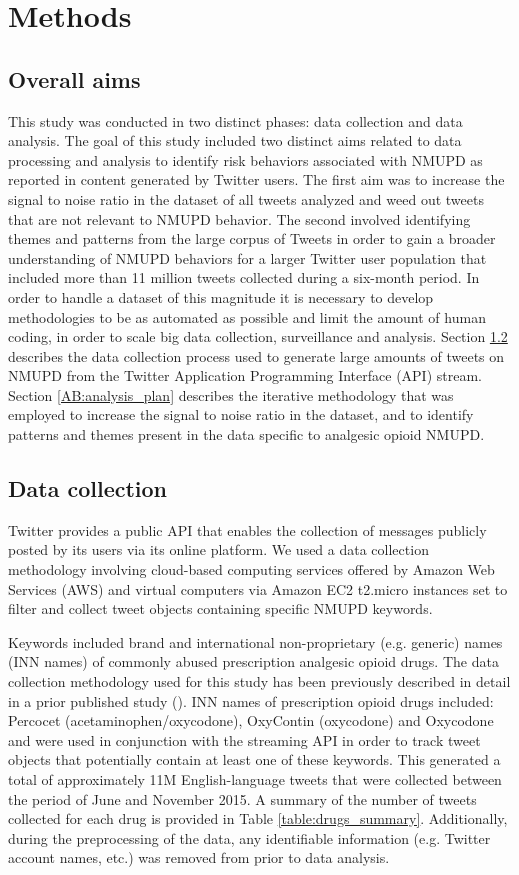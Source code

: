 \section{Methods}
\subsection{Overall aims}
This study was conducted in two distinct phases: 
data collection and data analysis. The goal of this study included 
two distinct aims related to data processing and analysis to identify 
risk behaviors associated with NMUPD as reported in content generated by Twitter users. 
The first aim was to increase the signal to noise ratio in 
the dataset of all tweets analyzed and weed out tweets that are not 
relevant to NMUPD behavior. The second involved identifying themes and
patterns from the large corpus of Tweets in order to gain a broader 
understanding of NMUPD behaviors for a larger Twitter user population that 
included more than 11 million tweets collected during a six-month period. 
In order to handle a dataset of this magnitude it is necessary to develop 
methodologies to be as automated as possible and limit the amount of human coding, 
in order to scale big data collection, surveillance and analysis. 
Section \ref{AB:data_collection} 
describes the data collection process used to generate large amounts of 
tweets on NMUPD from the Twitter Application Programming Interface (API) stream. 
Section \ref{AB:analysis_plan} describes the 
iterative methodology that was employed to 
increase the signal to noise ratio in the dataset, 
and to identify patterns and themes present in the data specific to analgesic opioid NMUPD.

\subsection{Data collection}
\label{AB:data_collection}
Twitter provides a public API that enables the collection 
of messages publicly posted by its users via its online platform. 
We used a data collection methodology involving cloud-based computing 
services offered by Amazon Web Services (AWS) and virtual computers via 
Amazon EC2 t2.micro instances set to filter and collect tweet 
objects containing specific NMUPD keywords.

Keywords included brand and international non-proprietary 
(e.g. generic) names (INN names) of commonly abused prescription 
analgesic opioid drugs. The data collection methodology used 
for this study has been previously described in detail in a prior 
published study (\cite{katsuki2015establishing}). 
INN names of prescription opioid drugs included: Percocet (acetaminophen/oxycodone),
OxyContin (oxycodone) and Oxycodone and were used in conjunction 
with the streaming API in order to track tweet objects that potentially 
contain at least one of these keywords. This generated a total of 
approximately 11M English-language tweets that were collected 
between the period of June and November 2015. A summary of the 
number of tweets collected for each drug is provided in Table \ref{table:drugs_summary}. 
Additionally, during the preprocessing of the data, 
any identifiable information (e.g. Twitter account names, etc.) 
was removed from prior to data analysis.

